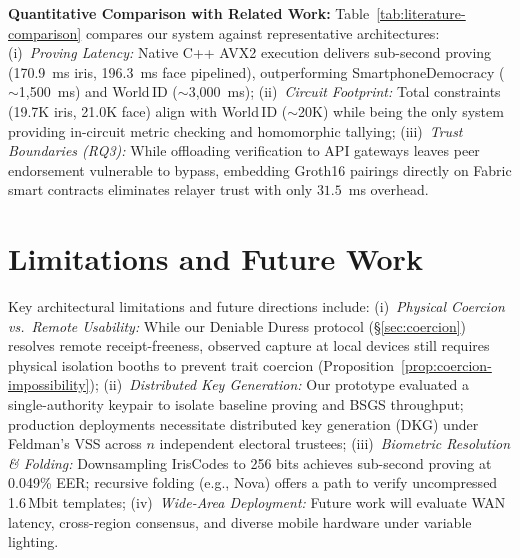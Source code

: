 \documentclass[10pt,letterpaper,journal]{IEEEtran}
\begin{document}
\textbf{Quantitative Comparison with Related Work:}
Table~\ref{tab:literature-comparison} compares our system against representative architectures:
(i)~\emph{Proving Latency:} Native C++ AVX2 execution delivers sub-second proving (170.9~ms iris, 196.3~ms face pipelined), outperforming SmartphoneDemocracy ($\sim$1,500~ms) and World\,ID ($\sim$3,000~ms);
(ii)~\emph{Circuit Footprint:} Total constraints (19.7K iris, 21.0K face) align with World\,ID ($\sim$20K) while being the only system providing in-circuit metric checking and homomorphic tallying;
(iii)~\emph{Trust Boundaries (RQ3):} While offloading verification to API gateways leaves peer endorsement vulnerable to bypass, embedding Groth16 pairings directly on Fabric smart contracts eliminates relayer trust with only $31.5$~ms overhead.

\section{Limitations and Future Work}
\label{sec:limitations}
Key architectural limitations and future directions include:
(i)~\emph{Physical Coercion vs.\ Remote Usability:} While our Deniable Duress protocol (\S\ref{sec:coercion}) resolves remote receipt-freeness, observed capture at local devices still requires physical isolation booths to prevent trait coercion (Proposition~\ref{prop:coercion-impossibility});
(ii)~\emph{Distributed Key Generation:} Our prototype evaluated a single-authority keypair to isolate baseline proving and BSGS throughput; production deployments necessitate distributed key generation (DKG) under Feldman's VSS across $n$ independent electoral trustees;
(iii)~\emph{Biometric Resolution \& Folding:} Downsampling IrisCodes to 256 bits achieves sub-second proving at 0.049\% EER; recursive folding (e.g., Nova) offers a path to verify uncompressed 1.6\,Mbit templates;
(iv)~\emph{Wide-Area Deployment:} Future work will evaluate WAN latency, cross-region consensus, and diverse mobile hardware under variable lighting.
\end{document}
